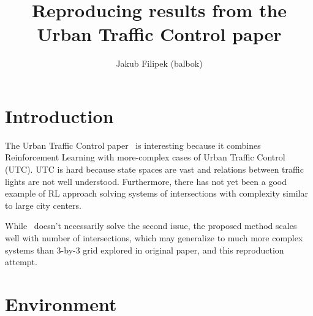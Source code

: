 \documentclass{article}
\begin{document}
    \title{Reproducing results from the Urban Traffic Control paper}
    \author{Jakub Filipek (balbok)}
    \maketitle

    \section{Introduction}
    \label{sec:intro}
    The Urban Traffic Control paper~\cite{utc} is interesting because it combines Reinforcement Learning with more-complex cases of Urban Traffic Control (UTC).
    UTC is hard because state spaces are vast and relations between traffic lights are not well understood.
    Furthermore, there has not yet been a good example of RL approach solving systems of intersections with complexity similar to large city centers.

    While~\cite{utc} doesn't necessarily solve the second issue, the proposed method scales well with number of intersections,
    which may generalize to much more complex systems than 3-by-3 grid explored in original paper, and this reproduction attempt.

    \section{Environment}
\end{document}
